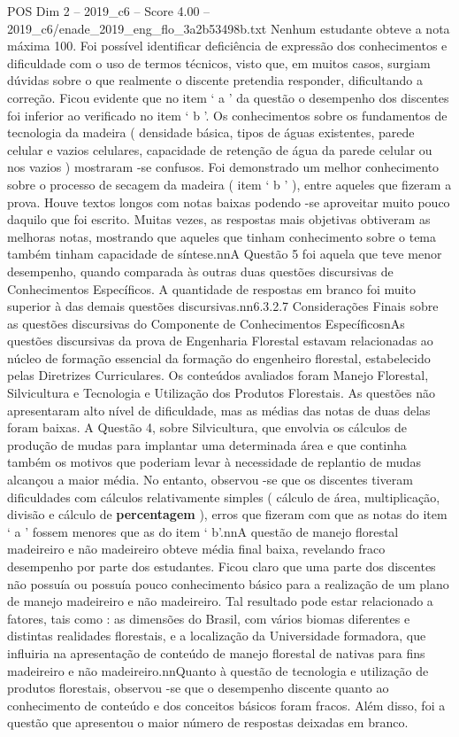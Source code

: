 \begin{textsample}{POS Dim 2 – 2019\_c6 – Score 4.00 – 2019\_c6/enade\_2019\_eng\_flo\_3a2b53498b.txt}
Nenhum estudante obteve a nota máxima 100.
Foi possível identificar deficiência de expressão dos conhecimentos e dificuldade com o uso de termos técnicos, visto que, em muitos casos, surgiam dúvidas sobre o que realmente o discente pretendia responder, dificultando a correção.
Ficou evidente que no item ‘ a ’ da questão o desempenho dos discentes foi inferior ao verificado no item ‘ b ’.
Os conhecimentos sobre os fundamentos de tecnologia da madeira ( densidade básica, tipos de águas existentes, parede celular e vazios celulares, capacidade de retenção de água da parede celular ou nos vazios ) mostraram -se confusos.
Foi demonstrado um melhor conhecimento sobre o processo de secagem da madeira ( item ‘ b ’ ), entre aqueles que fizeram a prova.
Houve textos longos com notas baixas podendo -se aproveitar muito pouco daquilo que foi escrito.
Muitas vezes, as respostas mais objetivas obtiveram as melhoras notas, mostrando que aqueles que tinham conhecimento sobre o tema também tinham capacidade de síntese.nnA Questão 5 foi aquela que teve menor desempenho, quando comparada às outras duas questões discursivas de Conhecimentos Específicos.
A quantidade de respostas em branco foi muito superior à das demais questões discursivas.nn6.3.2.7 Considerações Finais sobre as questões discursivas do Componente de Conhecimentos EspecíficosnAs questões discursivas da prova de Engenharia Florestal estavam relacionadas ao núcleo de formação essencial da formação do engenheiro florestal, estabelecido pelas Diretrizes Curriculares.
Os conteúdos avaliados foram Manejo Florestal, Silvicultura e Tecnologia e Utilização dos Produtos Florestais.
As questões não apresentaram alto nível de dificuldade, mas as médias das notas de duas delas foram baixas.
A Questão 4, sobre Silvicultura, que envolvia os cálculos de produção de mudas para implantar uma determinada área e que continha também os motivos que poderiam levar à necessidade de replantio de mudas alcançou a maior média.
No entanto, observou -se que os discentes tiveram dificuldades com cálculos relativamente simples ( cálculo de área, multiplicação, divisão e cálculo de \textbf{percentagem} ), erros que fizeram com que as notas do item ‘ a ’ fossem menores que as do item ‘ b’.nnA questão de manejo florestal madeireiro e não madeireiro obteve média final baixa, revelando fraco desempenho por parte dos estudantes.
Ficou claro que uma parte dos discentes não possuía ou possuía pouco conhecimento básico para a realização de um plano de manejo madeireiro e não madeireiro.
Tal resultado pode estar relacionado a fatores, tais como : as dimensões do Brasil, com vários biomas diferentes e distintas realidades florestais, e a localização da Universidade formadora, que influiria na apresentação de conteúdo de manejo florestal de nativas para fins madeireiro e não madeireiro.nnQuanto à questão de tecnologia e utilização de produtos florestais, observou -se que o desempenho discente quanto ao conhecimento de conteúdo e dos conceitos básicos foram fracos.
Além disso, foi a questão que apresentou o maior número de respostas deixadas em branco.

\end{textsample}
